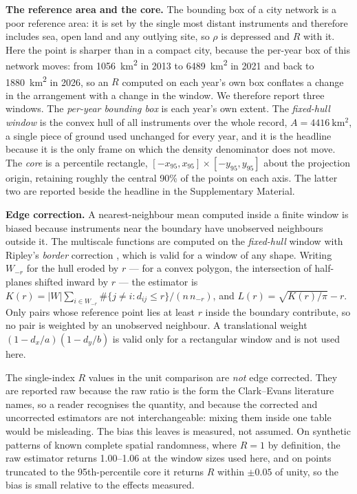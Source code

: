 \documentclass{article}
\begin{document}
\noindent\textbf{The reference area and the core.} The bounding box of a city network is a
poor reference area: it is set by the single most distant instruments and therefore
includes sea, open land and any outlying site, so $\rho$ is depressed and $R$ with it. Here
the point is sharper than in a compact city, because the per-year box of this network moves:
from \SI{1056}{\kilo\meter\squared} in 2013 to \SI{6489}{\kilo\meter\squared} in 2021
and back to \SI{1880}{\kilo\meter\squared} in 2026, so an $R$ computed on each year's own box
conflates a change in the arrangement with a change in the window. We therefore report three
windows. The \emph{per-year bounding box} is each year's own extent. The
\emph{fixed-hull window} is the convex hull of all instruments over the whole record,
$A = \SI{4416}{\kilo\meter\squared}$, a single piece of ground used unchanged for every year,
and it is the headline because it is the only frame on which the density denominator does not
move. The \emph{core} is a percentile rectangle, $[-x_{95}, x_{95}] \times [-y_{95}, y_{95}]$
about the projection origin, retaining roughly the central 90\% of the points on each axis.
The latter two are reported beside the headline in the Supplementary Material.

\noindent\textbf{Edge correction.} A nearest-neighbour mean computed inside a finite window
is biased because instruments near the boundary have unobserved neighbours outside it. The
multiscale functions are computed on the \emph{fixed-hull}
window with Ripley's \emph{border} correction \cite{ripley1977modelling}, which is valid for a
window of any shape.
Writing $W_{-r}$ for the hull eroded by $r$ --- for a convex polygon, the intersection of
half-planes shifted inward by $r$ --- the estimator is
$K(r) = |W| \sum_{i \in W_{-r}} \#\{j \neq i : d_{ij} \le r\} \big/ (n\,n_{-r})$, and
$L(r) = \sqrt{K(r)/\pi} - r$. Only pairs whose reference point lies at least $r$ inside the
boundary contribute, so no pair is weighted by an unobserved neighbour. A translational weight
$(1-d_x/a)(1-d_y/b)$ is valid only for a rectangular window and is not used here.

The single-index $R$ values in the unit comparison are \emph{not} edge corrected. They are
reported raw because the raw ratio is the form the Clark--Evans literature names, so a reader
recognises the quantity, and because the corrected and uncorrected estimators are not
interchangeable: mixing them inside one table would be misleading. The bias this leaves is
measured, not assumed. On synthetic patterns of known complete spatial randomness, where
$R = 1$ by definition, the raw estimator returns \num{1.00}--\num{1.06} at the window sizes used
here, and on points truncated to the 95th-percentile core it returns $R$ within $\pm\num{0.05}$
of unity, so the bias is small relative to the effects measured.
\end{document}
